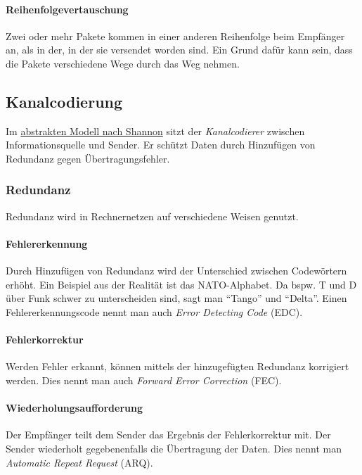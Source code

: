 \documentclass[a4paper, 14pt]{article}
\begin{document}
	\paragraph{Reihenfolgevertauschung}

	Zwei oder mehr Pakete kommen in einer anderen Reihenfolge beim Empfänger an, als in der, in der sie versendet worden sind.
	Ein Grund dafür kann sein, dass die Pakete verschiedene Wege durch das Weg nehmen.

	\subsection{Kanalcodierung}

	Im \hyperref[sec:shannon]{abstrakten Modell nach Shannon} sitzt der \emph{Kanalcodierer} zwischen Informationsquelle und Sender.
	Er schützt Daten durch Hinzufügen von Redundanz gegen Übertragungsfehler.

	\subsubsection{Redundanz}

	Redundanz wird in Rechnernetzen auf verschiedene Weisen genutzt.

	\paragraph{Fehlererkennung}

	Durch Hinzufügen von Redundanz wird der Unterschied zwischen Codewörtern erhöht.
	Ein Beispiel aus der Realität ist das NATO-Alphabet.
	Da bspw. T und D über Funk schwer zu unterscheiden sind, sagt man \enquote{Tango} und \enquote{Delta}.
	Einen Fehlererkennungscode nennt man auch \emph{Error Detecting Code} (EDC).

	\paragraph{Fehlerkorrektur}

	Werden Fehler erkannt, können mittels der hinzugefügten Redundanz korrigiert werden.
	Dies nennt man auch \emph{Forward Error Correction} (FEC).

	\paragraph{Wiederholungsaufforderung}

	Der Empfänger teilt dem Sender das Ergebnis der Fehlerkorrektur mit.
	Der Sender wiederholt gegebenenfalls die Übertragung der Daten.
	Dies nennt man \emph{Automatic Repeat Request} (ARQ).
\end{document}
